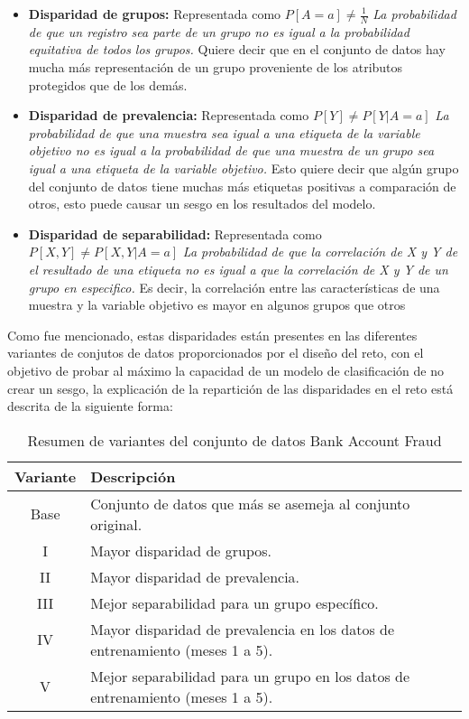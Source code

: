 \documentclass[runningheads]{llncs}
\begin{document}
\begin{itemize}
    \item \textbf{Disparidad de grupos:} Representada como $P[A=a] \neq \frac{1}{N}$ \textit{La probabilidad de que un registro sea parte de un grupo no es igual a la probabilidad equitativa de todos los grupos.} Quiere decir que en el conjunto de datos hay mucha más representación de un grupo proveniente de los atributos protegidos que de los demás.
    \item \textbf{Disparidad de prevalencia:} Representada como $P[Y] \neq P[Y|A=a]$ \textit{La probabilidad de que una muestra sea igual a una etiqueta de la variable objetivo no es igual a la probabilidad de que una muestra de un grupo sea igual a una etiqueta de la variable objetivo.} Esto quiere decir que algún grupo del conjunto de datos tiene muchas más etiquetas positivas a comparación de otros, esto puede causar un sesgo en los resultados del modelo.
    \item \textbf{Disparidad de separabilidad:} Representada como $P[X, Y] \neq P[X, Y|A=a]$ \textit{La probabilidad de que la correlación de X y Y de el resultado de una etiqueta no es igual a que la correlación de X y Y de un grupo en especifico.} Es decir, la correlación entre las características de una muestra y la variable objetivo es mayor en algunos grupos que otros 
\end{itemize}

Como fue mencionado, estas disparidades están presentes en las diferentes variantes de conjutos de datos proporcionados por el diseño del reto, con el objetivo de probar al máximo la capacidad de un modelo de clasificación de no crear un sesgo, la explicación de la repartición de las disparidades en el reto está descrita de la siguiente forma: 

\begin{table}[H]
\centering
\caption{Resumen de variantes del conjunto de datos Bank Account Fraud}
\label{tab:variantes}
\begin{tabular}{|c|p{10cm}|}
\hline
\textbf{Variante} & \textbf{Descripción} \\ \hline
Base & Conjunto de datos que más se asemeja al conjunto original. \\ \hline
I & Mayor disparidad de grupos. \\ \hline
II & Mayor disparidad de prevalencia. \\ \hline
III & Mejor separabilidad para un grupo específico. \\ \hline
IV & Mayor disparidad de prevalencia en los datos de entrenamiento (meses 1 a 5). \\ \hline
V & Mejor separabilidad para un grupo en los datos de entrenamiento (meses 1 a 5). \\ \hline
\end{tabular}
\end{table}
\end{document}

